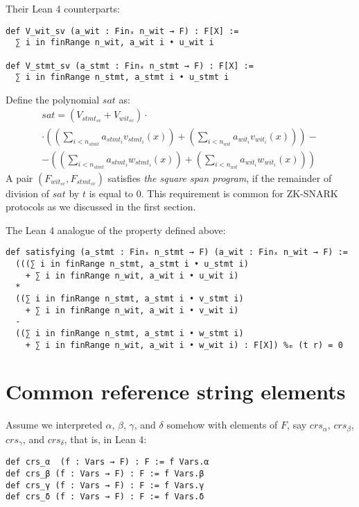 \documentclass{article}
\theoremstyle{definition}
\theoremstyle{remark}
\begin{document}
Their Lean 4 counterparts:
\begin{lstlisting}
def V_wit_sv (a_wit : Finₓ n_wit → F) : F[X] :=
  ∑ i in finRange n_wit, a_wit i • u_wit i

def V_stmt_sv (a_stmt : Finₓ n_stmt → F) : F[X] :=
  ∑ i in finRange n_stmt, a_stmt i • u_stmt i
\end{lstlisting}

Define the polynomial $sat$ as:
\begin{multline}
sat = (V_{{stmt}_{sv}} + V_{{wit}_{sv}}) \cdot \\ \cdot ((\sum \limits_{i < n_{stmt}} a_{{stmt}_i} v_{{stmt}_i}(x)) + (\sum \limits_{i < n_{wit}} a_{{wit}_i} v_{{wit}_i}(x) )) - \\ - ((\sum \limits_{i < n_{stmt}} a_{{stmt}_i} w_{{stmt}_i}(x)) + (\sum \limits_{i < n_{wit}} a_{{wit}_i} w_{{wit}_i}(x) ))
\end{multline}
A pair $(F_{{wit}_{sv}}, F_{{stmt}_{sv}})$ satisfies \emph{the square span program},
if the remainder of division of $sat$ by $t$ is equal to $0$.
This requirement is common for ZK-SNARK protocols as we discussed in the first section.

The Lean 4 analogue of the property defined above:
\begin{lstlisting}
def satisfying (a_stmt : Finₓ n_stmt → F) (a_wit : Finₓ n_wit → F) :=
  (((∑ i in finRange n_stmt, a_stmt i • u_stmt i)
    + ∑ i in finRange n_wit, a_wit i • u_wit i)
  *
  ((∑ i in finRange n_stmt, a_stmt i • v_stmt i)
    + ∑ i in finRange n_wit, a_wit i • v_wit i)
  -
  ((∑ i in finRange n_stmt, a_stmt i • w_stmt i)
    + ∑ i in finRange n_wit, a_wit i • w_wit i) : F[X]) %ₘ (t r) = 0
\end{lstlisting}

\section{Common reference string elements}

Assume we interpreted $\alpha$, $\beta$, $\gamma$, and $\delta$ somehow with elements of $F$, say $crs_{\alpha}$, $crs_{\beta}$, $crs_{\gamma}$, and $crs_{\delta}$, that is, in Lean 4:

\begin{lstlisting}
def crs_α  (f : Vars → F) : F := f Vars.α
def crs_β (f : Vars → F) : F := f Vars.β
def crs_γ (f : Vars → F) : F := f Vars.γ
def crs_δ (f : Vars → F) : F := f Vars.δ
\end{lstlisting}
\end{document}
